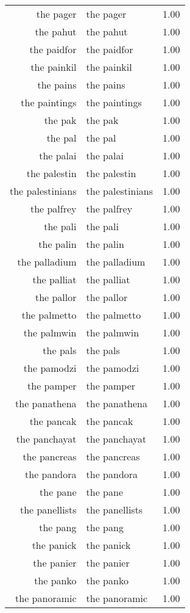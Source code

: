 \begin{table}[ht]
\begin{tabular}{rlr}
  the pager & the pager & 1.00 \\ 
  the pahut & the pahut & 1.00 \\ 
  the paidfor & the paidfor & 1.00 \\ 
  the painkil & the painkil & 1.00 \\ 
  the pains & the pains & 1.00 \\ 
  the paintings & the paintings & 1.00 \\ 
  the pak & the pak & 1.00 \\ 
  the pal & the pal & 1.00 \\ 
  the palai & the palai & 1.00 \\ 
  the palestin & the palestin & 1.00 \\ 
  the palestinians & the palestinians & 1.00 \\ 
  the palfrey & the palfrey & 1.00 \\ 
  the pali & the pali & 1.00 \\ 
  the palin & the palin & 1.00 \\ 
  the palladium & the palladium & 1.00 \\ 
  the palliat & the palliat & 1.00 \\ 
  the pallor & the pallor & 1.00 \\ 
  the palmetto & the palmetto & 1.00 \\ 
  the palmwin & the palmwin & 1.00 \\ 
  the pals & the pals & 1.00 \\ 
  the pamodzi & the pamodzi & 1.00 \\ 
  the pamper & the pamper & 1.00 \\ 
  the panathena & the panathena & 1.00 \\ 
  the pancak & the pancak & 1.00 \\ 
  the panchayat & the panchayat & 1.00 \\ 
  the pancreas & the pancreas & 1.00 \\ 
  the pandora & the pandora & 1.00 \\ 
  the pane & the pane & 1.00 \\ 
  the panellists & the panellists & 1.00 \\ 
  the pang & the pang & 1.00 \\ 
  the panick & the panick & 1.00 \\ 
  the panier & the panier & 1.00 \\ 
  the panko & the panko & 1.00 \\ 
  the panoramic & the panoramic & 1.00 \\ 

\end{tabular}
\end{table}
